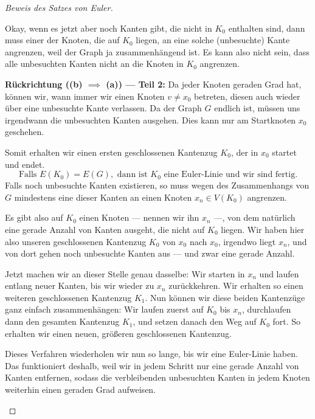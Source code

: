 \begin{proof}[Beweis des Satzes von Euler]
\begin{spoken-clean}[00:13:38 - 00:15:10]
Okay, wenn es jetzt aber noch Kanten gibt, die nicht in $K_0$ enthalten sind, dann muss einer der Knoten, die auf $K_0$ liegen, an eine solche (unbesuchte) Kante angrenzen, weil der Graph ja zusammenhängend ist. Es kann also nicht sein, dass alle unbesuchten Kanten nicht an die Knoten in $K_0$ angrenzen.
\end{spoken-clean}

\begin{math-stroke}
\textbf{Rückrichtung (\texorpdfstring{\textbf{(b)} $\implies$ \textbf{(a)}}{b -> a}) --- Teil 2:}
Da jeder Knoten geraden Grad hat, können wir, wann immer wir einen Knoten $v \neq x_0$ betreten, diesen auch wieder über eine unbesuchte Kante verlassen. Da der Graph $G$ endlich ist, müssen uns irgendwann die unbesuchten Kanten ausgehen. Dies kann nur am Startknoten $x_0$ geschehen. 

Somit erhalten wir einen ersten geschlossenen Kantenzug $K_0$, der in $x_0$ startet und endet.
\[
\text{Falls } E(K_0) = E(G), \text{ dann ist } K_0 \text{ eine Euler-Linie und wir sind fertig.}
\]
Falls noch unbesuchte Kanten existieren, so muss wegen des Zusammenhangs von $G$ mindestens eine dieser Kanten an einen Knoten $x_n \in V(K_0)$ angrenzen.
\end{math-stroke}

\begin{spoken-clean}[00:15:10 - 00:17:28]
Es gibt also auf $K_0$ einen Knoten --- nennen wir ihn $x_n$ ---, von dem natürlich eine gerade Anzahl von Kanten ausgeht, die nicht auf $K_0$ liegen. Wir haben hier also unseren geschlossenen Kantenzug $K_0$ von $x_0$ nach $x_0$, irgendwo liegt $x_n$, und von dort gehen noch unbesuchte Kanten aus --- und zwar eine gerade Anzahl.

Jetzt machen wir an dieser Stelle genau dasselbe: Wir starten in $x_n$ und laufen entlang neuer Kanten, bis wir wieder zu $x_n$ zurückkehren. Wir erhalten so einen weiteren geschlossenen Kantenzug $K_1$. Nun können wir diese beiden Kantenzüge ganz einfach zusammenhängen: Wir laufen zuerst auf $K_0$ bis $x_n$, durchlaufen dann den gesamten Kantenzug $K_1$, und setzen danach den Weg auf $K_0$ fort. So erhalten wir einen neuen, größeren geschlossenen Kantenzug.

Dieses Verfahren wiederholen wir nun so lange, bis wir eine Euler-Linie haben. Das funktioniert deshalb, weil wir in jedem Schritt nur eine gerade Anzahl von Kanten entfernen, sodass die verbleibenden unbesuchten Kanten in jedem Knoten weiterhin einen geraden Grad aufweisen.
\end{spoken-clean}


\end{proof}
